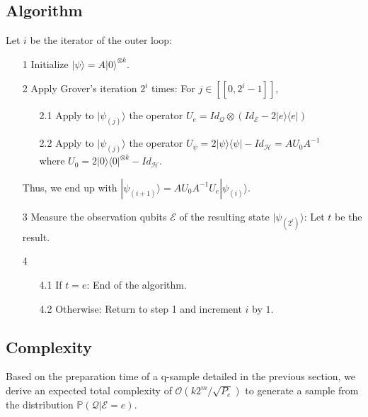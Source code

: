 \subsection{Algorithm}
\begin{algorithm}[H]
Let $i$ be the iterator of the outer loop:
\begin{itemize}
    \item[1] Initialize $|\psi \rangle = A|0\rangle^{\otimes k}$.
    \item[2] Apply Grover's iteration $2^i$ times: For $j \in [\![0, 2^i-1]\!]$,
    \begin{itemize}
  	 
   	 \item[2.1] Apply to $|\psi_{(j)}\rangle$ the operator $
   	 U_{e} = Id_{\mathcal{Q}} \otimes (Id_{\mathcal{E}} -  2|e \rangle \langle e| )
   	 $
   	 \item[2.2] Apply to $|\psi_{(j)}\rangle$ the operator $U_{\psi} = 2|\psi\rangle \langle \psi | - Id_{\mathcal{H}} = AU_{0}A^{-1}
   	 $
     \\ where $U_{0} = 2|0\rangle \langle 0|^{\otimes k} - Id_{\mathcal{H}}$.
   	 
    \end{itemize}
    \item[] Thus, we end up with $|\psi_{(i+1)}\rangle = AU_{0}A^{-1}U_{e} |\psi_{(i)} \rangle$.
    \item[3] Measure the observation qubits $\mathcal{E}$ of the resulting state $|\psi_{(2^i)} \rangle$: Let $t$ be the result.
	\item[4]
	\begin{itemize}
   	 \item[4.1] If $t=e$: End of the algorithm.
   	 \item[4.2] Otherwise: Return to step 1 and increment $i$ by $1$.
    \end{itemize}
\end{itemize}
\end{algorithm}
\subsection{Complexity}

Based on the preparation time of a q-sample detailed in the previous section, we derive an expected total complexity of $\mathcal{O}(k2^m/\sqrt{P_e})$ to generate a sample from the distribution $\mathbb{P}(\mathcal{Q}|\mathcal{E}=e)$.
